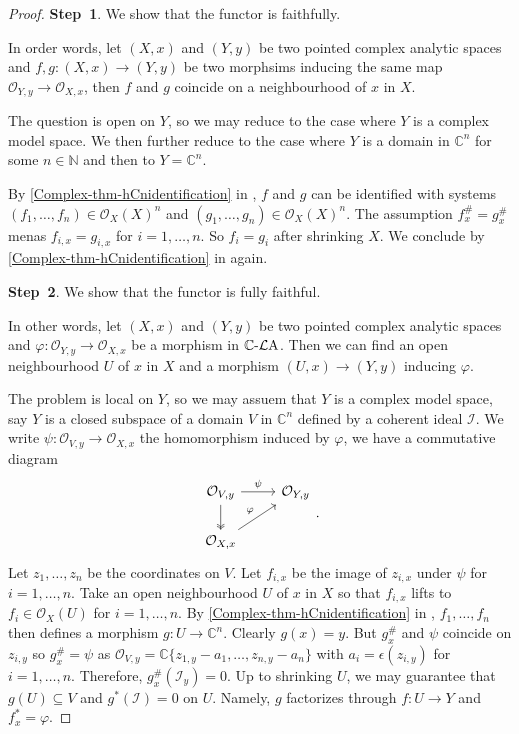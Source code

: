 \begin{proof}
    \textbf{Step~1}. We show that the functor is faithfully. 
    
    In order words, let $(X,x)$ and $(Y,y)$ be two pointed complex analytic spaces and $f,g:(X,x)\rightarrow (Y,y)$ be two morphsims inducing the same map $\mathcal{O}_{Y,y}\rightarrow  \mathcal{O}_{X,x}$, then $f$ and $g$ coincide on a neighbourhood of $x$ in $X$.

    The question is open on $Y$, so we may reduce to the case where $Y$ is a complex model space.  We then further reduce to the case where $Y$ is a domain in $\mathbb{C}^n$ for some $n\in \mathbb{N}$ and then to $Y=\mathbb{C}^n$.

    By \cref{Complex-thm-hCnidentification} in , $f$ and $g$ can be identified with systems $(f_1,\ldots,f_n)\in \mathcal{O}_X(X)^n$ and $(g_1,\ldots,g_n)\in \mathcal{O}_X(X)^n$. The assumption $f_x^{\#}=g_x^{\#}$ menas $f_{i,x}=g_{i,x}$ for $i=1,\ldots,n$. So $f_i=g_i$ after shrinking $X$. We conclude by  \cref{Complex-thm-hCnidentification} in  again.

    \textbf{Step~2}. We show that the functor is fully faithful. 
    
    In other words, let $(X,x)$ and $(Y,y)$ be two pointed complex analytic spaces and $\varphi:\mathcal{O}_{Y,y}\rightarrow \mathcal{O}_{X,x}$ be a morphism in $\mathbb{C}\text{-}\mathcal{L}\mathrm{A}$. Then we can find an open neighbourhood $U$ of $x$ in $X$ and a morphism $(U,x)\rightarrow (Y,y)$ inducing $\varphi$.

    The problem is local on $Y$, so we may assuem that $Y$ is a complex model space, say $Y$ is a closed subspace of a domain $V$ in $\mathbb{C}^n$ defined by a coherent ideal $\mathcal{I}$. We write $\psi:\mathcal{O}_{V,y}\rightarrow \mathcal{O}_{X,x}$ the homomorphism induced by $\varphi$, we have a commutative diagram
    \[
        \begin{tikzcd}
            {\mathcal{O}_{V,y}} \arrow[d, two heads] \arrow[r, "\psi"] & {\mathcal{O}_{Y,y}} \\
            {\mathcal{O}_{X,x}} \arrow[ru, "\varphi"]                  &                    
        \end{tikzcd}.  
    \]
    Let $z_1,\ldots,z_n$ be the coordinates on $V$.
    Let $f_{i,x}$ be the image of $z_{i,x}$ under $\psi$ for $i=1,\ldots,n$. Take an open neighbourhood $U$ of $x$ in $X$ so that $f_{i,x}$ lifts to $f_i\in \mathcal{O}_X(U)$ for $i=1,\ldots,n$. By \cref{Complex-thm-hCnidentification} in , $f_1,\ldots,f_n$ then defines a morphism $g:U\rightarrow \mathbb{C}^n$. Clearly $g(x)=y$. But $g_x^{\#}$ and $\psi$ coincide on $z_{i,y}$ so $g_x^{\#}=\psi$ as $\mathcal{O}_{V,y}=\mathbb{C}\{z_{1,y}-a_1,\ldots,z_{n,y}-a_n\}$ with $a_i=\epsilon(z_{i,y})$ for $i=1,\ldots,n$. Therefore, $g_x^{\#}(\mathcal{I}_y)=0$. Up to shrinking $U$, we may guarantee that $g(U)\subseteq V$ and $g^*(\mathcal{I})=0$ on $U$. Namely, $g$ factorizes through $f:U\rightarrow Y$ and $f^*_x=\varphi$.


\end{proof}
